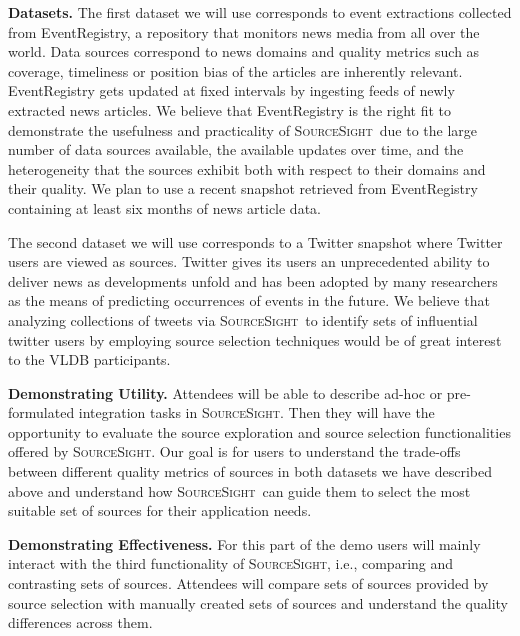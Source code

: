 \documentclass{vldb}
\newcommand\system{\textsc{SourceSight}}
\begin{document}
\vspace{2pt}\noindent\textbf{Datasets.} The first dataset we will use corresponds to event extractions collected from EventRegistry, a repository that monitors news media from all over the world. Data sources correspond to news domains and quality metrics such as coverage, timeliness or position bias of the articles are inherently relevant. EventRegistry gets updated at fixed intervals by ingesting feeds of newly extracted news articles. We believe that EventRegistry is the right fit to demonstrate the usefulness and practicality of \system~due to the large number of data sources available, the available updates over time, and the heterogeneity that the sources exhibit both with respect to their domains and their quality. We plan to use a recent snapshot retrieved from EventRegistry containing at least six months of news article data. 

The second dataset we will use corresponds to a Twitter snapshot where Twitter users are viewed as sources. Twitter gives its users an unprecedented ability to deliver news as developments unfold and has been adopted by many researchers as the means of predicting occurrences of events in the future. We believe that analyzing collections of tweets via \system~to identify sets of influential twitter users by employing source selection techniques would be of great interest to the VLDB participants.

\vspace{2pt}\noindent\textbf{Demonstrating Utility.} Attendees will be able to describe ad-hoc or pre-formulated integration tasks in \system. Then they will have the opportunity to evaluate the source exploration and source selection functionalities offered by \system. Our goal is for users to understand the trade-offs between different quality metrics of sources in both datasets we have described above and understand how \system~can guide them to select the most suitable set of sources for their application needs.

\vspace{2pt}\noindent\textbf{Demonstrating Effectiveness.} For this part of the demo users will mainly interact with the third functionality of \system, i.e., comparing and contrasting sets of sources. Attendees will compare sets of sources provided by source selection with manually created sets of sources and understand the quality differences across them. 

\end{document}
